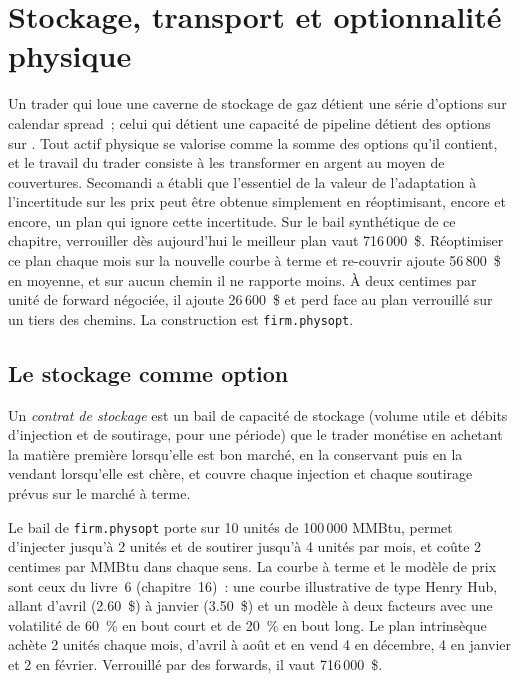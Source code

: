 \chapter{Stockage, transport et optionnalité physique}\label{ch:s2:storage-transport-and-physical-optionality}

Un trader qui loue une caverne de stockage de gaz détient une série d'options sur calendar spread~; celui qui détient une capacité de pipeline détient des options sur . Tout
actif physique se valorise comme la somme des options qu'il contient, et le travail du trader consiste à les transformer en argent au moyen de couvertures. Secomandi a établi que l'essentiel de la
valeur de l'adaptation à l'incertitude sur les prix peut être obtenue simplement en réoptimisant, encore et encore, un plan qui ignore cette incertitude. Sur le
bail synthétique de ce chapitre, verrouiller dès aujourd'hui le meilleur plan vaut 716\,000~\$. Réoptimiser ce plan chaque mois sur la nouvelle courbe à terme et re-couvrir ajoute
56\,800~\$ en moyenne, et sur aucun chemin il ne rapporte moins. À deux centimes par unité de forward négociée, il ajoute 26\,600~\$ et perd face au plan verrouillé sur un tiers
des chemins. La construction est \texttt{firm.physopt}.

\section{Le stockage comme option}

\begin{definition}\label{def:s2:storage-transport-and-physical-optionality:storage}
Un \emph{contrat de stockage} est un bail de capacité de stockage (volume utile et débits d'injection et de soutirage, pour une période) que le
trader monétise en achetant la matière première lorsqu'elle est bon marché, en la conservant puis en la vendant lorsqu'elle est chère, et couvre chaque injection et chaque soutirage prévus sur le
marché à terme.
\end{definition}

Le bail de \texttt{firm.physopt} porte sur 10 unités de 100\,000 MMBtu, permet d'injecter jusqu'à 2 unités et de soutirer jusqu'à 4 unités par mois, et coûte 2 centimes par MMBtu
dans chaque sens. La courbe à terme et le modèle de prix sont ceux du livre~6 (chapitre~16)~: une courbe illustrative de type Henry Hub, allant d'avril (2.60~\$) à janvier
(3.50~\$) et un modèle à deux facteurs avec une volatilité de 60~\% en bout court et de 20~\% en bout long. Le plan intrinsèque achète 2 unités chaque mois, d'avril à août
et en vend 4 en décembre, 4 en janvier et 2 en février. Verrouillé par des forwards, il vaut 716\,000~\$.

